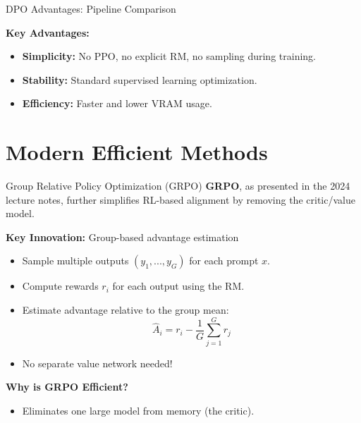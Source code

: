 \documentclass[xcolor=svgnames, 10pt, handout]{beamer}
\begin{document}
\begin{frame}{DPO Advantages: Pipeline Comparison}
    \begin{center}
\end{center}
    \pause

    \textbf{Key Advantages:}
    \begin{itemize}
        \item \textbf{Simplicity:} No PPO, no explicit RM, no sampling during training.
        \item \textbf{Stability:} Standard supervised learning optimization.
        \item \textbf{Efficiency:} Faster and lower VRAM usage.
    \end{itemize}
\end{frame}

\section{Modern Efficient Methods}

\begin{frame}{Group Relative Policy Optimization (GRPO)}
    \textbf{GRPO}, as presented in the 2024 lecture notes, further simplifies RL-based alignment by removing the critic/value model.
    \pause

    \textbf{Key Innovation:} Group-based advantage estimation
    \begin{itemize}
        \item Sample multiple outputs $(y_1, ..., y_G)$ for each prompt $x$.
        \pause
        \item Compute rewards $r_i$ for each output using the RM.
        \pause
        \item Estimate advantage relative to the group mean:
        $$ \hat{A}_i = r_i - \frac{1}{G}\sum_{j=1}^G r_j $$
        \pause
        \item No separate value network needed!
    \end{itemize}
    \pause

    \textbf{Why is GRPO Efficient?}
    \begin{itemize}
        \item Eliminates one large model from memory (the critic).
        \pause
        \pause
    \end{itemize}
\end{frame}
\end{document}
